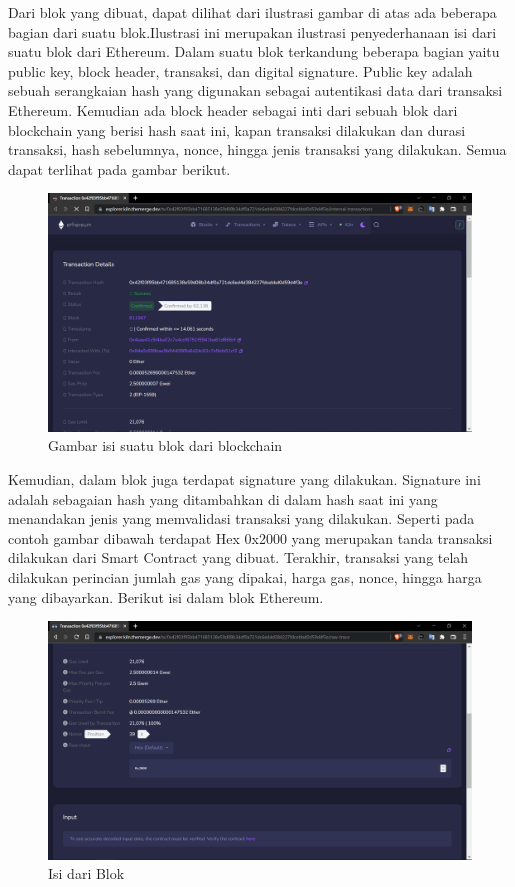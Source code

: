 Dari blok yang dibuat, dapat dilihat dari ilustrasi gambar di atas ada beberapa bagian dari suatu blok.Ilustrasi ini merupakan ilustrasi penyederhanaan isi dari suatu blok dari Ethereum. Dalam suatu blok terkandung beberapa bagian yaitu public key, block header, transaksi, dan digital signature. Public key adalah sebuah serangkaian hash yang digunakan sebagai autentikasi data dari transaksi Ethereum. Kemudian ada block header sebagai inti dari sebuah blok dari blockchain yang berisi hash saat ini, kapan transaksi dilakukan dan durasi transaksi, hash sebelumnya, nonce, hingga jenis transaksi yang dilakukan. Semua dapat terlihat pada gambar berikut.

\begin{figure}[htp]
\centering
\includegraphics[scale=0.2]{gambar/isi-blok-2.png}
\caption{Gambar isi suatu blok dari blockchain} 
\label{fig:isiblok2}
\end{figure}

Kemudian, dalam blok juga terdapat signature yang dilakukan. Signature ini adalah sebagaian hash yang ditambahkan di dalam hash saat ini yang menandakan jenis yang memvalidasi transaksi yang dilakukan. Seperti pada contoh gambar dibawah terdapat Hex 0x2000 yang merupakan tanda transaksi dilakukan dari Smart Contract yang dibuat. Terakhir, transaksi yang telah dilakukan perincian jumlah gas yang dipakai, harga gas, nonce, hingga harga yang dibayarkan. Berikut isi dalam blok Ethereum.

\begin{figure}[htp]
\centering
\includegraphics[scale=0.2]{gambar/isi-blok-3.png}
\caption{Isi dari Blok}
\label{fig:isiblok3}
\end{figure}

